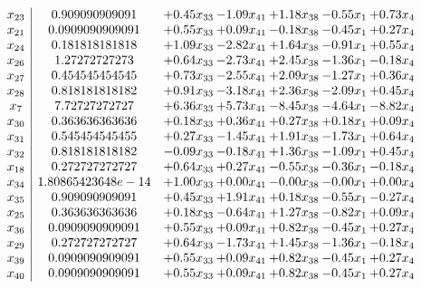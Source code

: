 \documentclass[8pt]{article}
\begin{document}
\[\begin{array}{c| c c@{\hskip 2pt} c@{\hskip 2pt} c@{\hskip 2pt} c@{\hskip 2pt} c@{\hskip 2pt} }
 x_{23}   &  0.909090909091 & +  0.45 x_{33} & -1.09 x_{41} & +  1.18 x_{38} & -0.55 x_{1} & +  0.73 x_{4}\\
 x_{21}   &  0.0909090909091 & +  0.55 x_{33} & +  0.09 x_{41} & -0.18 x_{38} & -0.45 x_{1} & +  0.27 x_{4}\\
 x_{24}   &  0.181818181818 & +  1.09 x_{33} & -2.82 x_{41} & +  1.64 x_{38} & -0.91 x_{1} & +  0.55 x_{4}\\
 x_{26}   &  1.27272727273 & +  0.64 x_{33} & -2.73 x_{41} & +  2.45 x_{38} & -1.36 x_{1} & -0.18 x_{4}\\
 x_{27}   &  0.454545454545 & +  0.73 x_{33} & -2.55 x_{41} & +  2.09 x_{38} & -1.27 x_{1} & +  0.36 x_{4}\\
 x_{28}   &  0.818181818182 & +  0.91 x_{33} & -3.18 x_{41} & +  2.36 x_{38} & -2.09 x_{1} & +  0.45 x_{4}\\
 x_{7}   &  7.72727272727 & +  6.36 x_{33} & +  5.73 x_{41} & -8.45 x_{38} & -4.64 x_{1} & -8.82 x_{4}\\
 x_{30}   &  0.363636363636 & +  0.18 x_{33} & +  0.36 x_{41} & +  0.27 x_{38} & +  0.18 x_{1} & +  0.09 x_{4}\\
 x_{31}   &  0.545454545455 & +  0.27 x_{33} & -1.45 x_{41} & +  1.91 x_{38} & -1.73 x_{1} & +  0.64 x_{4}\\
 x_{32}   &  0.818181818182 & -0.09 x_{33} & -0.18 x_{41} & +  1.36 x_{38} & -1.09 x_{1} & +  0.45 x_{4}\\
 x_{18}   &  0.272727272727 & +  0.64 x_{33} & +  0.27 x_{41} & -0.55 x_{38} & -0.36 x_{1} & -0.18 x_{4}\\
 x_{34}   &  1.80865423648e-14 & +  1.00 x_{33} & +  0.00 x_{41} & -0.00 x_{38} & -0.00 x_{1} & +  0.00 x_{4}\\
 x_{35}   &  0.909090909091 & +  0.45 x_{33} & +  1.91 x_{41} & +  0.18 x_{38} & -0.55 x_{1} & -0.27 x_{4}\\
 x_{25}   &  0.363636363636 & +  0.18 x_{33} & -0.64 x_{41} & +  1.27 x_{38} & -0.82 x_{1} & +  0.09 x_{4}\\
 x_{36}   &  0.0909090909091 & +  0.55 x_{33} & +  0.09 x_{41} & +  0.82 x_{38} & -0.45 x_{1} & +  0.27 x_{4}\\
 x_{29}   &  0.272727272727 & +  0.64 x_{33} & -1.73 x_{41} & +  1.45 x_{38} & -1.36 x_{1} & -0.18 x_{4}\\
 x_{39}   &  0.0909090909091 & +  0.55 x_{33} & +  0.09 x_{41} & +  0.82 x_{38} & -0.45 x_{1} & +  0.27 x_{4}\\
 x_{40}   &  0.0909090909091 & +  0.55 x_{33} & +  0.09 x_{41} & +  0.82 x_{38} & -0.45 x_{1} & +  0.27 x_{4}\\

\end{array}\]
\end{document}
